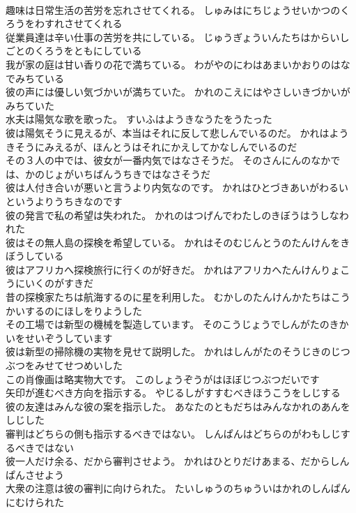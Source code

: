 \documentclass[8pt]{extreport}
\begin{document}
\begin{CJK}{UTF8}{min}
\\	趣味は日常生活の苦労を忘れさせてくれる。	しゅみはにちじょうせいかつのくろうをわすれさせてくれる 
\\	従業員達は辛い仕事の苦労を共にしている。	じゅうぎょういんたちはからいしごとのくろうをともにしている 
\\	我が家の庭は甘い香りの花で満ちている。	わがやのにわはあまいかおりのはなでみちている 
\\	彼の声には優しい気づかいが満ちていた。	かれのこえにはやさしいきづかいがみちていた 
\\	水夫は陽気な歌を歌った。	すいふはようきなうたをうたった 
\\	彼は陽気そうに見えるが、本当はそれに反して悲しんでいるのだ。	かれはようきそうにみえるが、ほんとうはそれにかえしてかなしんでいるのだ 
\\	その３人の中では、彼女が一番内気ではなさそうだ。	そのさんにんのなかでは、かのじょがいちばんうちきではなさそうだ 
\\	彼は人付き合いが悪いと言うより内気なのです。	かれはひとづきあいがわるいというよりうちきなのです 
\\	彼の発言で私の希望は失われた。	かれのはつげんでわたしのきぼうはうしなわれた 
\\	彼はその無人島の探検を希望している。	かれはそのむじんとうのたんけんをきぼうしている 
\\	彼はアフリカへ探検旅行に行くのが好きだ。	かれはアフリカへたんけんりょこうにいくのがすきだ 
\\	昔の探検家たちは航海するのに星を利用した。	むかしのたんけんかたちはこうかいするのにほしをりようした 
\\	その工場では新型の機械を製造しています。	そのこうじょうでしんがたのきかいをせいぞうしています 
\\	彼は新型の掃除機の実物を見せて説明した。	かれはしんがたのそうじきのじつぶつをみせてせつめいした 
\\	この肖像画は略実物大です。	このしょうぞうがはほぼじつぶつだいです 
\\	矢印が進むべき方向を指示する。	やじるしがすすむべきほうこうをしじする 
\\	彼の友達はみんな彼の案を指示した。	あなたのともだちはみんなかれのあんをしじした 
\\	審判はどちらの側も指示するべきではない。	しんぱんはどちらのがわもしじするべきではない 
\\	彼一人だけ余る、だから審判させよう。	かれはひとりだけあまる、だからしんぱんさせよう 
\\	大衆の注意は彼の審判に向けられた。	たいしゅうのちゅういはかれのしんぱんにむけられた 

\end{CJK}
\end{document}
